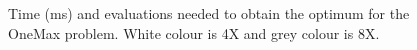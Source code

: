 \documentclass[final,1p,times]{elsarticle}
\begin{document}
\begin{figure}[htb]
\caption{Time (ms) and evaluations needed to obtain the optimum for the OneMax problem. White colour is 4X and grey colour is 8X.}
\label{fig:boxplotsONEMAX}
\end{figure}
\end{document}
